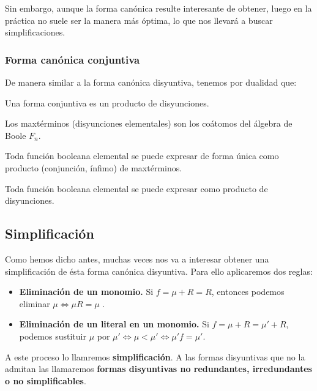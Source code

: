 Sin embargo, aunque la forma canónica resulte interesante de obtener, luego en la práctica no suele ser la manera más óptima, lo que nos llevará a buscar simplificaciones.

\subsubsection{Forma canónica conjuntiva}
De manera similar a la forma canónica disyuntiva, tenemos por dualidad que:
\begin{ndef}
    Una forma conjuntiva es un producto de disyunciones.
\end{ndef}
\begin{nth}
    Los maxtérminos (disyunciones elementales) son los coátomos del álgebra de Boole $F_n$.
\end{nth}
\begin{nth}
    Toda función booleana elemental se puede expresar de forma única como producto (conjunción, ínfimo) de maxtérminos.
\end{nth}
\begin{ncor}
    Toda función booleana elemental se puede expresar como producto de disyunciones.
\end{ncor}

\subsection{Simplificación}
Como hemos dicho antes, muchas veces nos va a interesar obtener una simplificación de ésta forma canónica disyuntiva. Para ello aplicaremos dos reglas:
\begin{itemize}
    \item \textbf{Eliminación de un monomio.} Si $f = \mu + R = R$, entonces podemos eliminar $\mu \Longleftrightarrow \mu R = \mu$ .
    \item \textbf{Eliminación de un literal en un monomio.} Si $f = \mu + R = \mu ' + R$, podemos sustituir $\mu$ por $\mu ' \Longleftrightarrow \mu < \mu ' \Longleftrightarrow \mu ' f = \mu '$.
\end{itemize}
A este proceso lo llamremos \textbf{simplificación}. A las formas disyuntivas que no la admitan las llamaremos \textbf{formas disyuntivas no redundantes, irredundantes o no simplificables}.

